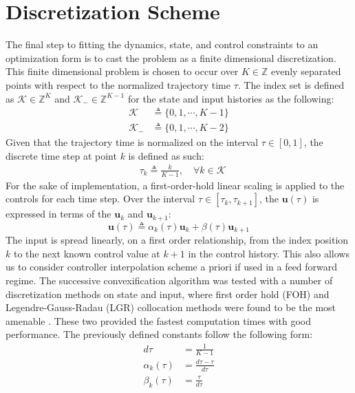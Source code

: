 \documentclass[conf]{new-aiaa}
\begin{document}
\section{Discretization Scheme}
The final step to fitting the dynamics, state, and control constraints to an optimization form is to cast the problem as a finite dimensional discretization. This finite dimensional problem is chosen to occur over $K\in\mathbb{Z}$ evenly separated points with respect to the normalized trajectory time $\tau$. The index set is defined as $\mathcal{K}\in\mathbb{Z}^{K}$ and $\mathcal{K}_-\in\mathbb{Z}^{K-1}$ for the state and input histories as the following:
\begin{align*}
	\mathcal{K} &\triangleq \{0,1,\cdots, K-1\} \\
	\mathcal{K}_- &\triangleq \{0,1,\cdots, K-2 \}
\end{align*}
%
Given that the trajectory time is normalized on the interval $\tau \in [0,1 ]$, the discrete time step at point $k$ is defined as such:
%
\begin{align}
& \tau_k \triangleq \frac{k}{K-1}, \quad \forall k \in \mathcal{K}
\end{align}
%
For the sake of implementation, a first-order-hold linear scaling is applied to the controls for each time step. Over the interval $\tau \in [\tau_k, \tau_{k+1}]$, the $\mathbf{u}(\tau)$ is expressed in terms of the $\mathbf{u}_k$
 and $\mathbf{u}_{k+1}$:
\begin{equation}
	\mathbf{u}(\tau) \triangleq \alpha_k(\tau) \mathbf{u}_k + \beta(\tau) \mathbf{u}_{k+1}
\end{equation}
%
The input is spread linearly, on a first order relationship, from the index position $k$ to the next known control value at $k+1$ in the control history. This also allows us to consider controller interpolation scheme a priori if used in a feed forward regime. The successive convexification algorithm was tested with a number of discretization methods on state and input, where first order hold (FOH) and Legendre-Gauss-Radau (LGR) collocation methods were found to be the most amenable \cite{malyuta2019discrete}. These two provided the fastest computation times with good performance.
%
The previously defined constants follow the following form:
\begin{align}
d\tau &= \frac{1}{K-1} \\
\alpha_k(\tau) &= \frac{d\tau - \tau}{d\tau} \\
\beta_k(\tau) &= \frac{\tau}{d\tau}
\end{align}
%
\end{document}
